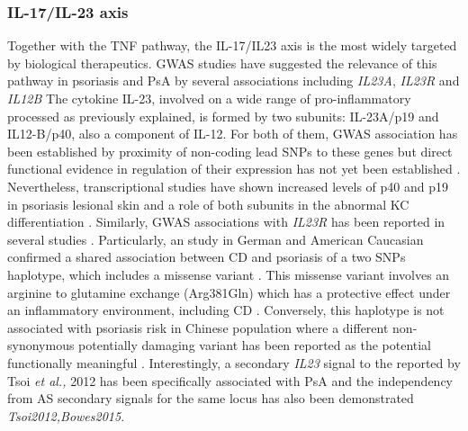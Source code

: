 
\subsubsection*{IL-17/IL-23 axis}
Together with the TNF pathway, the IL-17/IL23 axis is the most widely targeted by biological therapeutics. GWAS studies have suggested the relevance of this pathway in psoriasis and PsA by several associations including \textit{IL23A}, \textit{IL23R} and \textit{IL12B} %
The cytokine IL-23, involved on a wide range of pro-inflammatory processed as previously explained, is formed by two subunits: IL-23A/p19 and IL12-B/p40, also a component of IL-12. For both of them, GWAS association has been established by proximity of non-coding lead SNPs to these genes but direct functional evidence in regulation of their expression has not yet been established \parencite{Cargill2007,Strange2010,Tsoi2012}. Nevertheless, transcriptional studies have shown increased levels of p40 and p19 in psoriasis lesional skin and a role of both subunits in the abnormal KC differentiation \parencite{Lee2004,Zhu2011}. Similarly, GWAS associations with \textit{IL23R} has been reported in several studies \parencite{Nair2008, Strange2010}. Particularly, an study in German and American Caucasian confirmed a shared association between CD and psoriasis of a two SNPs haplotype, which includes a missense variant \parencite{Nair2008}. This missense variant involves an arginine to glutamine exchange (Arg381Gln) which has a protective effect under an inflammatory environment, including CD \parencite{Duerr2006}. Conversely, this haplotype is not associated with psoriasis risk in Chinese population where a different non-synonymous potentially damaging variant has been reported as the potential functionally meaningful \parencite{Tang2014}. Interestingly, a secondary \textit{IL23} signal to the reported by Tsoi \textit{et al.,} 2012 has been specifically associated with PsA and the independency from AS secondary signals for the same locus has also been demonstrated \textit{Tsoi2012,Bowes2015}. 
